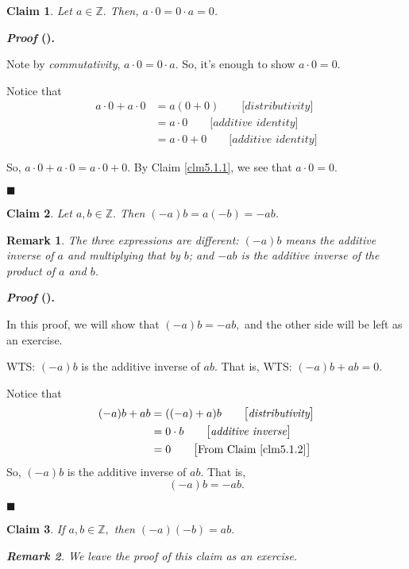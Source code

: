 \documentclass[12pt,a4paper]{article}
\newtheorem{clm}{Claim}[subsection]
\newcounter{nprf}[subsection]
\newtheorem*{rmk}{\indent Remark}
\newenvironment*{prf}{\par\indent\textbf{\textit{Proof} (\stepcounter{nprf}\thenprf). }\par }{\par\hfill $\blacksquare$\par}
\def\Z{{\mathbb{Z}}}
\begin{document}
\begin{framed}
\begin{clm}\label{clm5.1.2}
	Let $a\in\Z.$ Then, $a\cdot0=0\cdot a=0$.
\end{clm}
\begin{prf}
	Note by \textit{commutativity}, $a\cdot0=0\cdot a$. So, it's enough to show $a\cdot0=0.$\par Notice that \[\begin{aligned}a\cdot0+a\cdot0&=a(0+0)\qquad\big[\textit{distributivity}\big]\\&=a\cdot0\qquad\big[\textit{additive identity}\big]\\&=a\cdot0+0\qquad\big[\textit{additive identity}\big]\end{aligned}\]\par So, $a\cdot0+a\cdot0=a\cdot0+0.$ By Claim \ref{clm5.1.1}, we see that $a\cdot0=0.$
\end{prf}
\end{framed}
\begin{framed}
\begin{clm}
	Let	$a,b\in\Z.$ Then $(-a)b=a(-b)=-ab$.
\end{clm}
\begin{rmk}
	The three expressions are different: $(-a)b$ means the additive inverse of $a$ and multiplying that by $b$; and $-ab$ is the additive inverse of the product of $a$ and $b$.	
\end{rmk}
\begin{prf}	
	In this proof, we will show that $(-a)b=-ab,$ and the other side will be left as an exercise.\par WTS: $(-a)b$ is the additive inverse of $ab$. That is, WTS: $(-a)b+ab=0.$\par Notice that \[\begin{aligned}(-a)b+ab&=((-a)+a)b\qquad\big[\textit{distributivity}\big]\\&=0\cdot b\qquad\big[\textit{additive inverse}\big]\\&=0\qquad\big[\text{From Claim \ref{clm5.1.2}}\big]\end{aligned}\] So, $(-a)b$ is the additive inverse of $ab$. That is, \[(-a)b=-ab.\]
\end{prf}
\end{framed}
\begin{clm}\label{clm5.1.4}
	If $a,b\in\Z,$ then $(-a)(-b)=ab.$	
	\begin{rmk} We leave the proof of this claim as an exercise. \end{rmk}
\end{clm}
\end{document}
